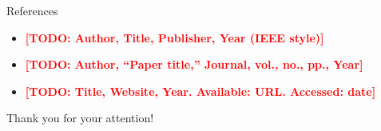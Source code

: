 \documentclass[aspectratio=169, 14pt]{beamer}
\newcommand{\todo}[1]{\textcolor{red}{\textbf{[TODO: #1]}}}
\begin{document}
\begin{frame}{References}
  \begin{itemize}
    \item[{[1]}] \todo{Author, Title, Publisher, Year (IEEE style)}
    \item[{[2]}] \todo{Author, ``Paper title,'' Journal, vol., no., pp., Year}
    \item[{[3]}] \todo{Title, Website, Year. Available: URL. Accessed: date}
  \end{itemize}
\end{frame}

\begin{frame}[plain]
  \begin{center}
    \vspace{1.4cm}
    {\Large\color{hseblue}Thank you for your attention!}\\[0.8cm]
    {\normalsize\color{hseblue}\hseAuthorNameEn}\\[0.2cm]
    \ifhseHasAuthorEmail
      {\small\color{black}\hseAuthorEmail}\\[0.2cm]
    \fi
    {\small\color{black}\hseTitle}
  \end{center}
\end{frame}
\end{document}
